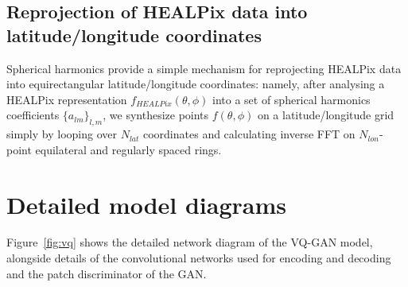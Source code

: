 \documentclass[11pt, a4paper, logo, copyright, numbering]{googledeepmind}
\begin{document}
\subsection{Reprojection of HEALPix data into latitude/longitude coordinates}

Spherical harmonics provide a simple mechanism for reprojecting HEALPix data into equirectangular latitude/longitude coordinates: namely, after analysing a HEALPix representation $f_{HEALPix}(\theta, \phi)$ into a set of spherical harmonics coefficients $\{a_{lm}\}_{l,m}$, we synthesize points $f(\theta,\phi)$ on a latitude/longitude grid simply by looping over $N_{lat}$ coordinates and calculating inverse FFT on $N_{lon}$-point equilateral and regularly spaced rings. 
\section{Detailed model diagrams}
\label{sx:appendix:models}
Figure~\ref{fig:vq} shows the detailed network diagram of the VQ-GAN model, alongside details of the convolutional networks used for encoding and decoding and the patch discriminator of the GAN.
\end{document}
